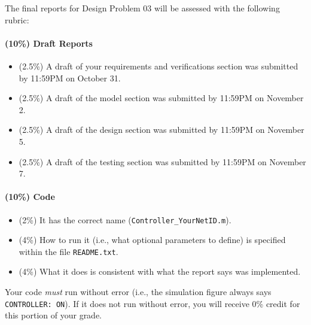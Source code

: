 \documentclass[12pt]{article}
\begin{document}
\clearpage
\noindent
The final reports for Design Problem 03 will be assessed with the following rubric:

\paragraph{(10\%) Draft Reports}
\begin{itemize}

\item (2.5\%) A draft of your requirements and verifications section was submitted by 11:59PM on October 31.

\item (2.5\%) A draft of the model section was submitted by 11:59PM on November 2.

\item (2.5\%) A draft of the design section was submitted by 11:59PM on November 5.

\item (2.5\%) A draft of the testing section was submitted by 11:59PM on November 7.
\end{itemize}



\paragraph{(10\%) Code}
\begin{itemize}

\item (2\%) It has the correct name (\verb|Controller_YourNetID.m|).
\item (4\%) How to run it (i.e., what optional parameters to define) is specified within the file \verb|README.txt|.
\item (4\%) What it does is consistent with what the report says was implemented.

\end{itemize}
Your code {\em must} run without error (i.e., the simulation figure always says \verb|CONTROLLER: ON|). If it does not run without error, you will receive 0\% credit for this portion of your grade.
\end{document}
